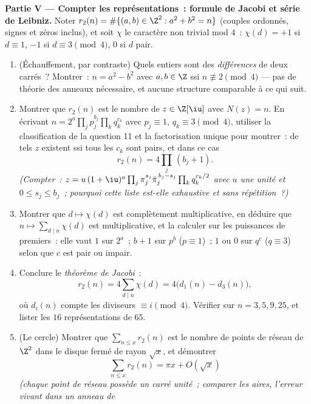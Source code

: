 \begin{problem}
\medskip
\noindent\textbf{Partie V --- Compter les représentations~:
formule de Jacobi et série de Leibniz.} Noter $r_2(n) =
\#\{(a, b) \in \Z^2 : a^2 + b^2 = n\}$ (couples ordonnés,
signes et zéros inclus), et soit $\chi$ le caractère non trivial
mod $4$~: $\chi(d) = +1$ si $d \equiv 1$, $-1$ si $d \equiv 3
\pmod4$, $0$ si $d$ pair.
\begin{enumerate}[resume]
  \item (Échauffement, par contraste) Quels entiers sont des
        \emph{différences} de deux carrés~? Montrer~: $n = a^2 -
        b^2$ avec $a, b \in \Z$ ssi $n \not\equiv 2 \pmod 4$ ---
        pas de théorie des anneaux nécessaire, et aucune
        structure comparable à ce qui suit.
  \item Montrer que $r_2(n)$ est le nombre de $z \in \Z[\iu]$
        avec $N(z) = n$. En écrivant $n = 2^{a}\prod_jp_j^{b_j}
        \prod_kq_k^{c_k}$ avec $p_j \equiv 1$, $q_k \equiv 3
        \pmod4$, utiliser la classification de la question 11 et
        la factorisation unique pour montrer~: de tels $z$
        existent ssi tous les $c_k$ sont pairs, et dans ce cas
        \[
        r_2(n) = 4\prod_j\,(b_j + 1) .
        \]
        \emph{(Compter~: $z = u\,(1+\iu)^{a}\prod_j\pi_j^{s_j}
        \bar\pi_j^{\,b_j - s_j}\prod_kq_k^{c_k/2}$ avec $u$ une
        unité et $0 \leq s_j \leq b_j$~; pourquoi cette liste
        est-elle exhaustive et sans répétition~?)}
  \item Montrer que $d \mapsto \chi(d)$ est complètement
        multiplicative, en déduire que $n \mapsto
        \sum_{d \mid n}\chi(d)$ est multiplicative, et la
        calculer sur les puissances de premiers~: elle vaut $1$
        sur $2^a$~; $b + 1$ sur $p^b$ ($p \equiv 1$)~; $1$ ou
        $0$ sur $q^c$ ($q \equiv 3$) selon que $c$ est pair ou
        impair.
  \item Conclure le \emph{théorème de Jacobi}~:
        \[
        r_2(n) = 4\sum_{d \mid n}\chi(d) =
        4\bigl(d_1(n) - d_3(n)\bigr),
        \]
        où $d_i(n)$ compte les diviseurs $\equiv i \pmod 4$.
        Vérifier sur $n = 3, 5, 9, 25$, et lister les $16$
        représentations de $65$.
  \item (Le cercle) Montrer que $\sum_{n \leq x}r_2(n)$ est le
        nombre de points de réseau de $\Z^2$ dans le disque
        fermé de rayon $\sqrt x$, et démontrer
        \[
        \sum_{n\leq x}r_2(n) = \pi x + O(\sqrt x)
        \]
        \emph{(chaque point de réseau possède un carré unité~;
        comparer les aires, l'erreur vivant dans un anneau de
}
\end{enumerate}
\end{problem}
